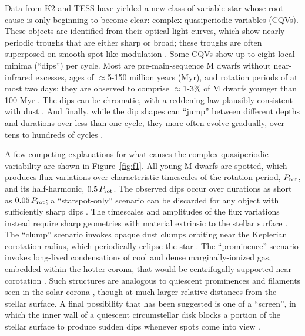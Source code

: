 \documentclass[11pt,twocolumn,tighten]{aastex63}
\begin{document}
Data from K2 and TESS have yielded a new class of variable star whose
root cause is only beginning to become clear: complex quasiperiodic
variables (CQVs).  These objects are identified from their optical
light curves, which show nearly periodic troughs that are either sharp
or broad; these troughs are often superposed on smooth spot-like
modulation
\citep{2017AJ....153..152S,2018AJ....155...63S,2019ApJ...876..127Z}.
Some CQVs show up to eight local minima (``dips'') per cycle.  Most
are pre-main-sequence M dwarfs without near-infrared excesses, ages of
$\approx$5-150 million years (Myr), and rotation periods of at most
two days; they are observed to comprise $\approx$1-3\% of M dwarfs
younger than 100 Myr \citep{2016AJ....152..114R,2022AJ....163..144G}.
The dips can be chromatic, with a reddening law plausibly consistent
with dust
\citep{2020AJ....160...86B,2022AJ....163..144G,2023MNRAS.518.2921K}.
And finally, while the dip shapes can ``jump'' between different
depths and durations over less than one cycle, they more often evolve
gradually, over tens to hundreds of cycles
\citep[e.g.][]{2017AJ....153..152S,2022ApJ...925...75P,2023ApJ...945..114P}.

A few competing explanations for what causes the complex quasiperiodic
variability are shown in Figure~\ref{fig:f1}.  All young M dwarfs are
spotted, which produces flux variations over characteristic timescales
of the rotation period, $P_{\rm rot}$, and its half-harmonic,
$0.5\,P_{\rm rot}$.  The observed dips occur over durations as short
as $0.05\,P_{\rm rot}$; a ``starspot-only'' scenario can be discarded
for any object with sufficiently sharp dips
\citep{2017AJ....153..152S,2021MNRAS.500.1366K}.   The timescales and
amplitudes of the flux variations instead require sharp geometries
with material extrinsic to the stellar surface
\citep[e.g.][]{2017AJ....153..152S,2022AJ....163..144G}.  The
``clump'' scenario invokes opaque dust clumps orbiting near the
Keplerian corotation radius, which periodically eclipse the star
\citep{2017AJ....153..152S,2023MNRAS.518.4734S}.  The ``prominence''
scenario invokes long-lived condensations of cool and dense
marginally-ionized gas, embedded within the hotter corona, that would
be centrifugally supported near corotation
\citep{1989MNRAS.238..657C,2019MNRAS.482.2853J,2022MNRAS.514.5465W}.
Such structures are analogous to quiescent prominences and filaments
seen in the solar corona \citep[see e.g.][]{2015ASSL..415.....V},
though at much larger relative distances from the stellar surface.  A
final possibility that has been suggested is one of a ``screen'', in
which the inner wall of a quiescent circumstellar disk blocks a
portion of the stellar surface to produce sudden dips whenever spots
come into view \citep{2019ApJ...876..127Z}.  
\end{document}
